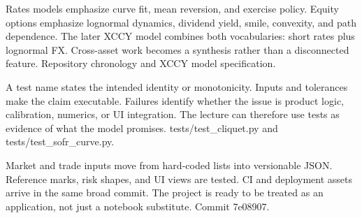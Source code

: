 {Rates models emphasize curve fit, mean reversion, and exercise policy.}
{Equity options emphasize lognormal dynamics, dividend yield, smile, convexity, and path dependence.}
{The later XCCY model combines both vocabularies: short rates plus lognormal FX.}
{Cross-asset work becomes a synthesis rather than a disconnected feature.}
{Repository chronology and XCCY model specification.}

{A test name states the intended identity or monotonicity.}
{Inputs and tolerances make the claim executable.}
{Failures identify whether the issue is product logic, calibration, numerics, or UI integration.}
{The lecture can therefore use tests as evidence of what the model promises.}
{tests/test\_cliquet.py and tests/test\_sofr\_curve.py.}

{Market and trade inputs move from hard-coded lists into versionable JSON.}
{Reference marks, risk shapes, and UI views are tested.}
{CI and deployment assets arrive in the same broad commit.}
{The project is ready to be treated as an application, not just a notebook substitute.}
{Commit 7e08907.}
